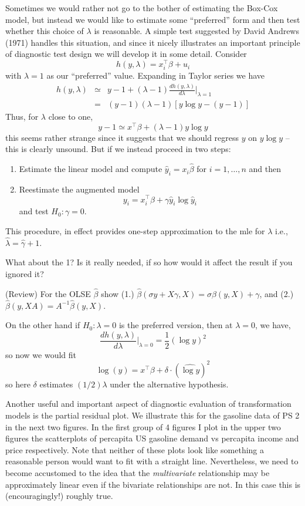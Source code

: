 \documentclass[11pt]{amsbook}
\begin{document}
%

Sometimes we would rather not go to the bother of estimating the Box-Cox
model, but instead we would like to estimate some ``preferred'' form and
then test whether this choice of $\lambda$ is reasonable. 
A simple test suggested by David Andrews (1971) handles this situation, 
and since it nicely illustrates an important principle of diagnostic test
design we will develop it in some detail.  Consider
$$
h(y, \lambda) = x_i^\top \beta + u_i
$$
with $\lambda =1$ as our ``preferred'' value.  Expanding in Taylor series 
we have 
\begin{eqnarray*}
h(y, \lambda) &\simeq& y-1 + (\lambda - 1) \frac{d h(y,\lambda)}{d\lambda}
|_{\lambda=1} \\
&=&  (y-1) (\lambda-1) [ y \log y - (y-1) ]
\end{eqnarray*}
Thus, for $\lambda$ close to one,
$$
y-1 \simeq x^\top \beta + (\lambda -1) y \log y
$$
this seems rather strange since it suggests that we should regress
$y$ on $y \log y $ -- this is clearly unsound.  But if we instead proceed 
in two steps:
\begin{enumerate}
\item Estimate the linear model and compute $\hat y_i = x_i\hat \beta $ 
for $i=1, \ldots, n$ and then
\item Reestimate the augmented model
$$
y_i = x_i^\top \beta + \gamma \hat y_i \log \hat y_i
$$
and test $H_0: \gamma = 0$.
\end{enumerate}
This procedure, in effect provides one-step approximation to the mle for $\lambda$
i.e., $\hat\lambda = \hat\gamma +1.$

\vspace{5mm}
  What about the 1? Is it really needed, if so how
would it affect the result if you ignored it?

\vspace{5mm}
 (Review)  For the OLSE $\hat\beta$ show
(1.) $\hat\beta (\sigma y + X\gamma, X) = \sigma\hat\beta (y, X) + \gamma$, 
and 
(2.) $\hat \beta (y, XA) = A^{-1} \hat\beta(y, X).$

On the other hand if $H_0: \lambda =0$ is the preferred version, then at
$\lambda = 0$, we have,
$$
\frac{dh(y,\lambda)}{d\lambda}|_{\lambda=0} = \frac{1}{2}(\log y)^2
$$
so now we would fit
$$
\log(y) = x^\top \beta+\delta \cdot (\widehat{\log y})^2
$$
so here $\delta $ estimates $(1/2) \lambda$ under the alternative hypothesis.

Another useful and important aspect of diagnostic evaluation of transformation
models is the partial residual plot.  We illustrate this for the gasoline
data of PS 2 in the next two figures.  In the first group of 4 figures
I plot in the upper two figures the scatterplots of percapita US gasoline
demand vs percapita income and price respectively.  Note that neither of
these plots look like something a reasonable person would want to fit
with a straight line.  Nevertheless, we need to become accustomed to
the idea that the {\it multivariate} relationship may be approximately
linear even if the bivariate relationships are not.  In this case this
is (encouragingly!) roughly true.  
\end{document}
